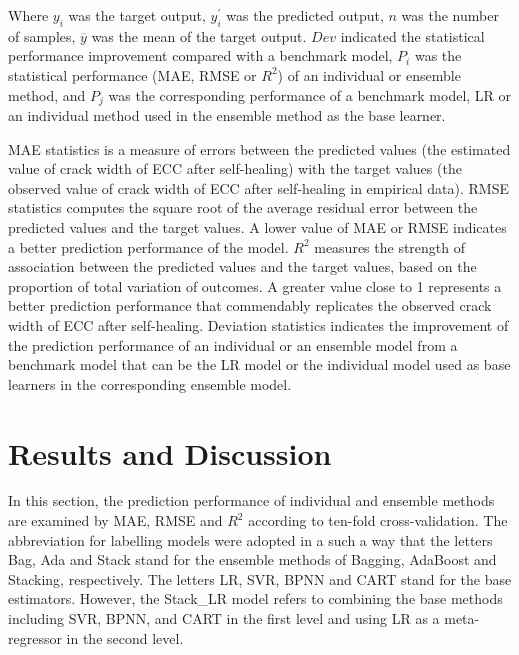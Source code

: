 \documentclass[11pt]{article}
\begin{document}
	Where $y_i$ was the target output, $y_i^{'}$ was the predicted output, $n$ was the number of samples, $\overline{y}$ was the mean of the target output. $Dev$ indicated the statistical performance improvement compared with a benchmark model, $P_i$ was the statistical performance (MAE, RMSE or  $R^2$) of an individual or ensemble method, and $P_j$ was the corresponding performance of a benchmark model, LR or an individual method used in the ensemble method as the base learner.
	
	MAE statistics is a measure of errors between the predicted values (the estimated value of crack width of ECC after self-healing) with the target  values (the observed value of crack width of ECC after self-healing in empirical data). RMSE statistics computes the square root of the average residual error between the predicted values and the target values. A lower value of MAE or RMSE indicates a better prediction performance of the model. $R^2$ measures the strength of association between the predicted values and the target values, based on the proportion of total variation of outcomes. A greater value close to 1 represents a better prediction performance that commendably replicates the observed crack width of ECC after self-healing.  Deviation statistics indicates the improvement of the prediction performance of an individual or an ensemble model from a benchmark model that can be the LR model or the individual model used as base learners in the corresponding ensemble model. 
	
	
	
	
	\section{Results and Discussion}
	\label{result}

	In this section, the prediction performance of individual and ensemble methods are examined by MAE, RMSE and $R^2$ according to ten-fold cross-validation. The abbreviation for labelling models were adopted in a such a way that the letters Bag, Ada and Stack stand for the ensemble methods of Bagging, AdaBoost and Stacking, respectively. The letters LR, SVR, BPNN and CART stand for the base estimators. However, the Stack\_LR model refers to combining the base methods including SVR, BPNN, and CART in the first level and using LR as a meta-regressor in the second level.
	
\end{document}
